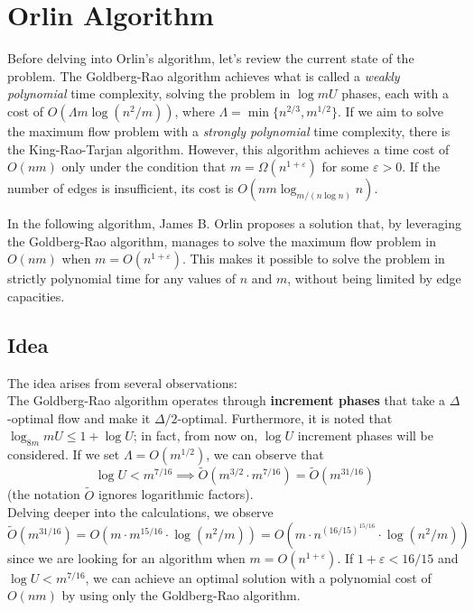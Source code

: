 
\chapter{Orlin Algorithm} \label{chap:Orlin}

    Before delving into Orlin's algorithm, let's review the current state of the problem.  
    The Goldberg-Rao algorithm achieves what is called a \textit{weakly polynomial} time complexity, solving the problem in \(\log mU\) phases, each with a cost of \( O(\Lambda m \log(n^2/m)) \), where \( \Lambda = \min \{n^{2/3}, m^{1/2}\} \).  
    If we aim to solve the maximum flow problem with a \textit{strongly polynomial} time complexity, there is the King-Rao-Tarjan algorithm. However, this algorithm achieves a time cost of \( O(nm) \) only under the condition that \( m = \Omega (n^{1+\varepsilon}) \) for some \( \varepsilon > 0 \).  
    If the number of edges is insufficient, its cost is \( O(nm \log_{m / (n \log n)} n) \).  

    In the following algorithm, James B. Orlin proposes a solution that, by leveraging the Goldberg-Rao algorithm, manages to solve the maximum flow problem in \( O(nm) \) when \( m = O(n^{1+\varepsilon}) \). This makes it possible to solve the problem in strictly polynomial time for any values of \( n \) and \( m \), without being limited by edge capacities.


\section{Idea}

    The idea arises from several observations:\\
    The Goldberg-Rao algorithm operates through \textbf{increment phases} that take a \(\Delta\)-optimal flow and make it \(\Delta/2\)-optimal.  
    Furthermore, it is noted that \(\log_{8m} mU \leq 1 + \log U\); in fact, from now on, \(\log U\) increment phases will be considered.  
    If we set \(\Lambda = O(m^{1/2})\), we can observe that  
    \[
    \log U < m^{7/16} \implies \tilde{O}(m^{3/2} \cdot m^{7/16}) = \tilde{O}(m^{31/16})
    \]
    (the notation \(\tilde{O}\) ignores logarithmic factors).\\
    Delving deeper into the calculations, we observe  
    \[
    \tilde{O}(m^{31/16}) = O(m \cdot m^{15/16} \cdot \log(n^2/m)) = O(m \cdot n^{(16/15)^{15/16}} \cdot \log(n^2/m))
    \]
    since we are looking for an algorithm when \(m = O(n^{1+\varepsilon})\). If \(1+\varepsilon < 16/15\) and \(\log U < m^{7/16}\), we can achieve an optimal solution with a polynomial cost of \(O(nm)\) by using only the Goldberg-Rao algorithm.

